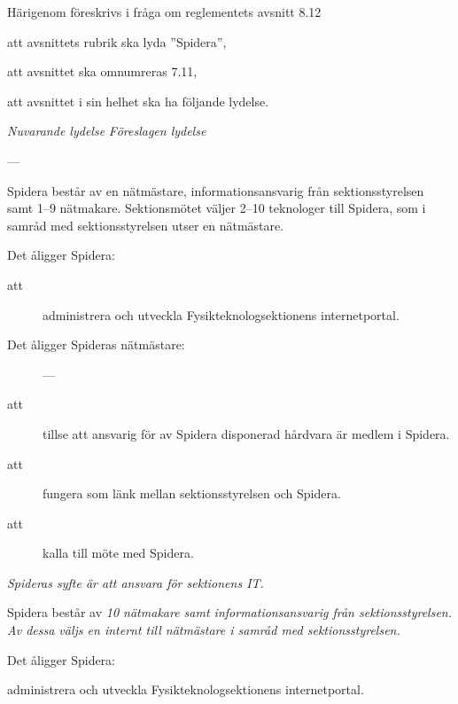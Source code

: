 \documentclass{article}
\newenvironment{lydelse}
    {\begin{paracol}{2}%
        \emph{Nuvarande lydelse}%
        \switchcolumn%
        \emph{Föreslagen lydelse}%
    \end{paracol}%
    \begin{enumerate}[label=\thesubsection.\arabic*]%
    \begin{paracol}{2}%
    }{\end{paracol}\end{enumerate}}
\begin{document}
Härigenom föreskrivs i fråga om reglementets avsnitt 8.12

\begin{dels}
    \item att avsnittets rubrik ska lyda ''Spidera'',
    \item att avsnittet ska omnumreras 7.11,
    \item att avsnittet i sin helhet ska ha följande lydelse.
\end{dels}
\begin{lydelse}
    \setcounter{section}{8}
    \setcounter{subsection}{12}
    
    \item[] ---
    
    \item Spidera består av en nätmästare, informationsansvarig från sektionsstyrelsen samt 1--9 nätmakare. Sektionsmötet väljer 2--10 teknologer till Spidera, som i samråd med sektionsstyrelsen utser en nätmästare.

	\item Det åligger Spidera:
	\begin{description}
		\item[att] administrera och utveckla Fysikteknologsektionens internetportal.
	\end{description}

	\item Det åligger Spideras nätmästare:
	\begin{description}
	    \item[] ---
		\item[att] tillse att ansvarig för av Spidera disponerad hårdvara är medlem i Spidera.
		\item[att] fungera som länk mellan sektionsstyrelsen och Spidera.
		\item[att] kalla till möte med Spidera.
	\end{description}
    
    \setcounter{section}{7}
    \setcounter{subsection}{11}
    \switchcolumn
    
    \item \emph{Spideras syfte är att ansvara för sektionens IT.}

    \item Spidera består av \emph{10 nätmakare samt informationsansvarig från sektionsstyrelsen.
    Av dessa väljs en internt till nätmästare i samråd med sektionsstyrelsen.}
    
    \vspace{1.2em}
    \item Det åligger Spidera:
    \begin{aligganden}
        \vspace{-0.4em}
        \item administrera och utveckla Fysikteknologsektionens internetportal.
    \end{aligganden}
    

\end{lydelse}
\end{document}
